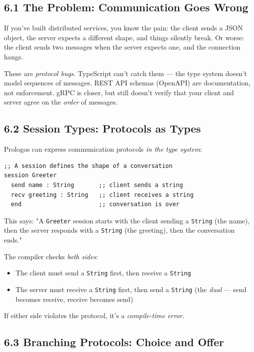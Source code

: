 \documentclass[11pt]{article}
\begin{document}
\subsection{6.1 The Problem: Communication Goes Wrong}
\label{sec:org8c120c4}

If you've built distributed services, you know the pain: the client
sends a JSON object, the server expects a different shape, and things
silently break. Or worse: the client sends two messages when the server
expects one, and the connection hangs.

These are \emph{protocol bugs}. TypeScript can't catch them --- the type system
doesn't model sequences of messages. REST API schemas (OpenAPI) are
documentation, not enforcement. gRPC is closer, but still doesn't verify
that your client and server agree on the \emph{order} of messages.
\subsection{6.2 Session Types: Protocols as Types}
\label{sec:org3c7fbee}

Prologos can express communication protocols \emph{in the type system}:

\begin{verbatim}
;; A session defines the shape of a conversation
session Greeter
  send name : String       ;; client sends a string
  recv greeting : String   ;; client receives a string
  end                      ;; conversation is over
\end{verbatim}

This says: "A \texttt{Greeter} session starts with the client sending a
\texttt{String} (the name), then the server responds with a \texttt{String}
(the greeting), then the conversation ends."

The compiler checks \emph{both sides}:
\begin{itemize}
\item The client must send a \texttt{String} first, then receive a \texttt{String}
\item The server must receive a \texttt{String} first, then send a \texttt{String}
(the \emph{dual} --- send becomes receive, receive becomes send)
\end{itemize}

If either side violates the protocol, it's a \emph{compile-time error}.
\subsection{6.3 Branching Protocols: Choice and Offer}
\label{sec:org277b8af}
\end{document}
